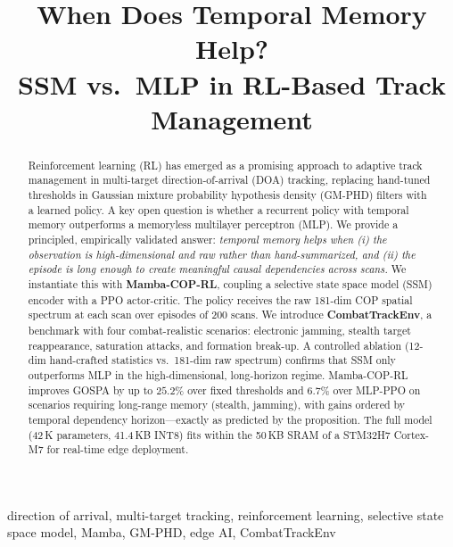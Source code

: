 \documentclass[conference]{IEEEtran}
\begin{document}
\title{When Does Temporal Memory Help?\\
SSM vs.\ MLP in RL-Based Track Management}

\author{
}

\maketitle

\begin{abstract}
Reinforcement learning (RL) has emerged as a promising approach to
adaptive track management in multi-target direction-of-arrival (DOA)
tracking, replacing hand-tuned thresholds in Gaussian mixture
probability hypothesis density (GM-PHD) filters with a learned policy.
A key open question is whether a recurrent policy with temporal memory
outperforms a memoryless multilayer perceptron (MLP).
We provide a principled, empirically validated answer: \emph{temporal
memory helps when (i) the observation is high-dimensional and raw
rather than hand-summarized, and (ii) the episode is long enough to
create meaningful causal dependencies across scans.}
We instantiate this with \textbf{Mamba-COP-RL}, coupling a selective
state space model (SSM) encoder with a PPO actor-critic.
The policy receives the raw 181-dim COP spatial spectrum at each scan
over episodes of 200 scans.
We introduce \textbf{CombatTrackEnv}, a benchmark with four
combat-realistic scenarios: electronic jamming, stealth target
reappearance, saturation attacks, and formation break-up.
A controlled ablation (12-dim hand-crafted statistics vs.\ 181-dim
raw spectrum) confirms that SSM only outperforms MLP in the
high-dimensional, long-horizon regime.
Mamba-COP-RL improves GOSPA by up to $25.2\%$ over fixed thresholds
and $6.7\%$ over MLP-PPO on scenarios requiring long-range memory
(stealth, jamming), with gains ordered by temporal dependency
horizon---exactly as predicted by the proposition.
The full model (42\,K parameters, 41.4\,KB INT8) fits within the
50\,KB SRAM of a STM32H7 Cortex-M7 for real-time edge deployment.
\end{abstract}

\begin{IEEEkeywords}
direction of arrival, multi-target tracking, reinforcement learning,
selective state space model, Mamba, GM-PHD, edge AI, CombatTrackEnv
\end{IEEEkeywords}
\end{document}
